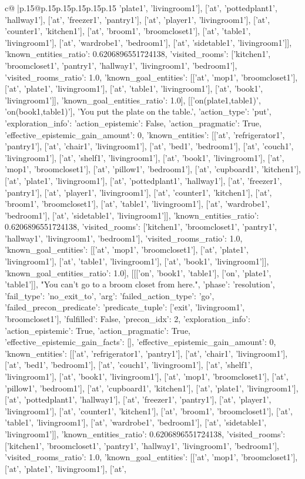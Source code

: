 \documentclass{article}
\begin{document}
{\begin{supertabular}{c@{$\;$}|p{.15\linewidth}@{}p{.15\linewidth}p{.15\linewidth}p{.15\linewidth}p{.15\linewidth}p{.15\linewidth}}
{{{'plate1', 'livingroom1'], ['at', 'pottedplant1', 'hallway1'], ['at', 'freezer1', 'pantry1'], ['at', 'player1', 'livingroom1'], ['at', 'counter1', 'kitchen1'], ['at', 'broom1', 'broomcloset1'], ['at', 'table1', 'livingroom1'], ['at', 'wardrobe1', 'bedroom1'], ['at', 'sidetable1', 'livingroom1']], 'known_entities_ratio': 0.6206896551724138, 'visited_rooms': ['kitchen1', 'broomcloset1', 'pantry1', 'hallway1', 'livingroom1', 'bedroom1'], 'visited_rooms_ratio': 1.0, 'known_goal_entities': [['at', 'mop1', 'broomcloset1'], ['at', 'plate1', 'livingroom1'], ['at', 'table1', 'livingroom1'], ['at', 'book1', 'livingroom1']], 'known_goal_entities_ratio': 1.0}}], [['on(plate1,table1)', 'on(book1,table1)'], 'You put the plate on the table.', {'action_type': 'put', 'exploration_info': {'action_epistemic': False, 'action_pragmatic': True, 'effective_epistemic_gain_amount': 0, 'known_entities': [['at', 'refrigerator1', 'pantry1'], ['at', 'chair1', 'livingroom1'], ['at', 'bed1', 'bedroom1'], ['at', 'couch1', 'livingroom1'], ['at', 'shelf1', 'livingroom1'], ['at', 'book1', 'livingroom1'], ['at', 'mop1', 'broomcloset1'], ['at', 'pillow1', 'bedroom1'], ['at', 'cupboard1', 'kitchen1'], ['at', 'plate1', 'livingroom1'], ['at', 'pottedplant1', 'hallway1'], ['at', 'freezer1', 'pantry1'], ['at', 'player1', 'livingroom1'], ['at', 'counter1', 'kitchen1'], ['at', 'broom1', 'broomcloset1'], ['at', 'table1', 'livingroom1'], ['at', 'wardrobe1', 'bedroom1'], ['at', 'sidetable1', 'livingroom1']], 'known_entities_ratio': 0.6206896551724138, 'visited_rooms': ['kitchen1', 'broomcloset1', 'pantry1', 'hallway1', 'livingroom1', 'bedroom1'], 'visited_rooms_ratio': 1.0, 'known_goal_entities': [['at', 'mop1', 'broomcloset1'], ['at', 'plate1', 'livingroom1'], ['at', 'table1', 'livingroom1'], ['at', 'book1', 'livingroom1']], 'known_goal_entities_ratio': 1.0}}], [[['on', 'book1', 'table1'], ['on', 'plate1', 'table1']], "You can't go to a broom closet from here.", {'phase': 'resolution', 'fail_type': 'no_exit_to', 'arg': {'failed_action_type': 'go', 'failed_precon_predicate': {'predicate_tuple': ['exit', 'livingroom1', 'broomcloset1'], 'fulfilled': False, 'precon_idx': 2}}, 'exploration_info': {'action_epistemic': True, 'action_pragmatic': True, 'effective_epistemic_gain_facts': [], 'effective_epistemic_gain_amount': 0, 'known_entities': [['at', 'refrigerator1', 'pantry1'], ['at', 'chair1', 'livingroom1'], ['at', 'bed1', 'bedroom1'], ['at', 'couch1', 'livingroom1'], ['at', 'shelf1', 'livingroom1'], ['at', 'book1', 'livingroom1'], ['at', 'mop1', 'broomcloset1'], ['at', 'pillow1', 'bedroom1'], ['at', 'cupboard1', 'kitchen1'], ['at', 'plate1', 'livingroom1'], ['at', 'pottedplant1', 'hallway1'], ['at', 'freezer1', 'pantry1'], ['at', 'player1', 'livingroom1'], ['at', 'counter1', 'kitchen1'], ['at', 'broom1', 'broomcloset1'], ['at', 'table1', 'livingroom1'], ['at', 'wardrobe1', 'bedroom1'], ['at', 'sidetable1', 'livingroom1']], 'known_entities_ratio': 0.6206896551724138, 'visited_rooms': ['kitchen1', 'broomcloset1', 'pantry1', 'hallway1', 'livingroom1', 'bedroom1'], 'visited_rooms_ratio': 1.0, 'known_goal_entities': [['at', 'mop1', 'broomcloset1'], ['at', 'plate1', 'livingroom1'], ['at', }}}
\end{supertabular}}
\end{document}
